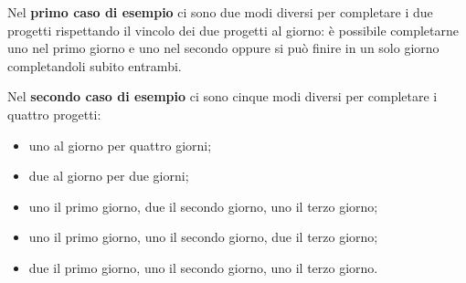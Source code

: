\pagebreak

\Examples
\begin{example}
%
%
\end{example}

\Explanation

Nel \textbf{primo caso di esempio} ci sono due modi diversi per completare i due progetti rispettando il vincolo dei due progetti al giorno: è possibile completarne uno nel primo giorno e uno nel secondo oppure si può finire in un solo giorno completandoli subito entrambi.

Nel \textbf{secondo caso di esempio} ci sono cinque modi diversi per completare i quattro progetti:
\begin{itemize}[nolistsep, itemsep=2mm]
    \item uno al giorno per quattro giorni;
    \item due al giorno per due giorni;
    \item uno il primo giorno, due il secondo giorno, uno il terzo giorno;
    \item uno il primo giorno, uno il secondo giorno, due il terzo giorno;
    \item due il primo giorno, uno il secondo giorno, uno il terzo giorno.
\end{itemize}


